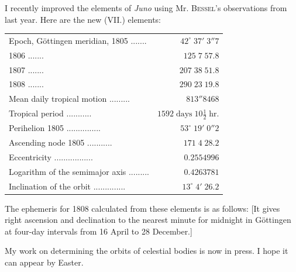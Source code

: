 \par\indent I recently improved the elements of \emph{Juno} using Mr. \textsc{Bessel}’s observations from last year. Here are the new (VII.) elements:


\begin{center}\fontsize{10}{12}\selectfont\setlength{\tabcolsep}{3pt}\renewcommand{\arraystretch}{1.15}\begin{tabular}{lr}
Epoch, Göttingen meridian, 1805 .\;.\;.\;.\;.\;.\;.\; & $42^\circ\;37'\;3''7$ \\
1806 .\;.\;.\;.\;.\;.\;.\; & $125\;7\;57.8$ \\
1807 .\;.\;.\;.\;.\;.\;.\; & $207\;38\;51.8$ \\
1808 .\;.\;.\;.\;.\;.\;.\; & $290\;23\;19.8$ \\
Mean daily tropical motion .\;.\;.\;.\;.\;.\;.\;.\;.\; & $813''8468$ \\
Tropical period .\;.\;.\;.\;.\;.\;.\;.\;.\;.\;.\; & $1592\;\text{days}\;10\tfrac12\;\text{hr.}$ \\
Perihelion 1805 .\;.\;.\;.\;.\;.\;.\;.\;.\;.\;.\;.\;.\;.\;.\; & $53^\circ\;19'\;0''2$ \\
Ascending node 1805 .\;.\;.\;.\;.\;.\;.\;.\;.\;.\;.\; & $171\;4\;28.2$ \\
Eccentricity .\;.\;.\;.\;.\;.\;.\;.\;.\;.\;.\;.\;.\;.\;.\;.\;.\; & $0.2554996$ \\
Logarithm of the semimajor axis .\;.\;.\;.\;.\;.\;.\;.\;.\; & $0.4263781$ \\
Inclination of the orbit .\;.\;.\;.\;.\;.\;.\;.\;.\;.\;.\;.\;.\;.\; & $13^\circ\;4'\;26.2$ \\
\end{tabular}\end{center}


\par\indent The ephemeris for 1808 calculated from these elements is as follows: [It gives right ascension and declination to the nearest minute for midnight in Göttingen at four-day intervals from 16 April to 28 December.]

\par\indent My work on determining the orbits of celestial bodies is now in press. I hope it can appear by Easter.

